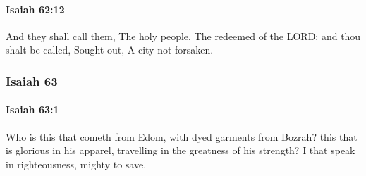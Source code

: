 		\paragraph{Isaiah 62:12} %
			\label{ISAIAH-62-12}

			And they shall call them, The holy people, The redeemed of the LORD: and thou shalt be called, Sought out, A city not forsaken.

	\subsubsection{Isaiah 63} %
		\label{ISAIAH-63}

		\paragraph{Isaiah 63:1} %
			\label{ISAIAH-63-1}

			Who is this that cometh from Edom, with dyed garments from Bozrah? this that is glorious in his apparel, travelling in the greatness of his strength? I that speak in righteousness, mighty to save.

